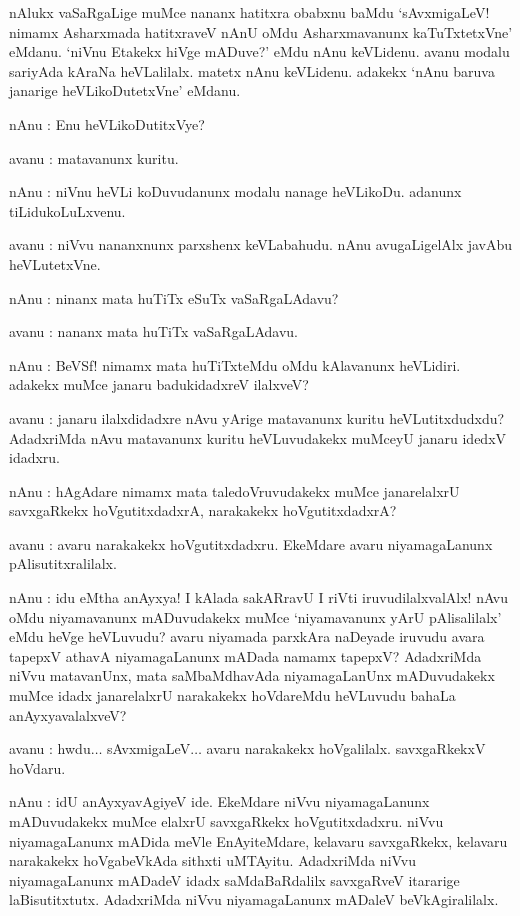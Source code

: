 nAlukx vaSaRgaLige muMce nananx hatitxra obabxnu baMdu `sAvxmigaLeV! nimamx Asharxmada hatitxraveV nAnU oMdu Asharxmavanunx kaTuTxtetxVne' eMdanu. `niVnu Etakekx hiVge mADuve?' eMdu nAnu keVLidenu. avanu modalu sariyAda kAraNa heVLalilalx. matetx nAnu keVLidenu. adakekx `nAnu baruva janarige heVLikoDutetxVne' eMdanu.

nAnu : Enu heVLikoDutitxVye?

avanu : matavanunx kuritu.

nAnu : niVnu heVLi koDuvudanunx modalu nanage heVLikoDu. adanunx 
tiLidukoLuLxvenu.

avanu : niVvu nananxnunx parxshenx keVLabahudu. nAnu avugaLigelAlx 
javAbu heVLutetxVne.

nAnu : ninanx mata huTiTx eSuTx vaSaRgaLAdavu?

avanu : nananx mata huTiTx {} vaSaRgaLAdavu.

nAnu : BeVSf! nimamx mata huTiTxteMdu oMdu kAlavanunx heVLidiri. adakekx muMce janaru badukidadxreV ilalxveV?

avanu : janaru ilalxdidadxre nAvu yArige matavanunx kuritu heVLutitxdudxdu? AdadxriMda nAvu matavanunx kuritu heVLuvudakekx muMceyU janaru idedxV idadxru.

nAnu : hAgAdare nimamx mata taledoVruvudakekx muMce janarelalxrU savxgaRkekx hoVgutitxdadxrA, narakakekx hoVgutitxdadxrA?

avanu : avaru narakakekx hoVgutitxdadxru. EkeMdare avaru niyamagaLanunx pAlisutitxralilalx.

nAnu : idu eMtha anAyxya! I kAlada sakARravU I riVti iruvudilalxvalAlx! nAvu oMdu niyamavanunx mADuvudakekx muMce `niyamavanunx yArU pAlisalilalx' eMdu heVge heVLuvudu? avaru niyamada parxkAra naDeyade iruvudu avara tapepxV athavA niyamagaLanunx mADada namamx tapepxV? AdadxriMda niVvu matavanUnx, mata saMbaMdhavAda niyamagaLanUnx mADuvudakekx muMce idadx janarelalxrU narakakekx hoVdareMdu heVLuvudu bahaLa anAyxyavalalxveV?

avanu : hwdu$\ldots$ sAvxmigaLeV$\ldots$ avaru narakakekx hoVgalilalx. savxgaRkekxV hoVdaru.

nAnu : idU anAyxyavAgiyeV ide. EkeMdare niVvu niyamagaLanunx mADuvudakekx muMce elalxrU savxgaRkekx hoVgutitxdadxru. niVvu niyamagaLanunx mADida meVle EnAyiteMdare, kelavaru savxgaRkekx, kelavaru narakakekx hoVgabeVkAda sithxti uMTAyitu. AdadxriMda niVvu niyamagaLanunx mADadeV idadx saMdaBaRdalilx savxgaRveV itararige laBisutitxtutx. AdadxriMda niVvu niyamagaLanunx mADaleV beVkAgiralilalx.

